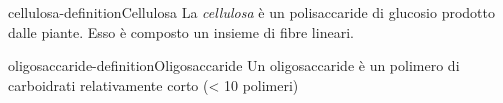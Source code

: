\documentclass[preview]{standalone}
\begin{document}
\begin{snippetdefinition}{cellulosa-definition}{Cellulosa}
    La \textit{cellulosa} è un polisaccaride di glucosio prodotto dalle piante.
    Esso è composto un insieme di fibre lineari.
\end{snippetdefinition}


\begin{snippetdefinition}{oligosaccaride-definition}{Oligosaccaride}
  Un oligosaccaride è un polimero di carboidrati relativamente corto (< 10 polimeri)
\end{snippetdefinition}

\end{document}
